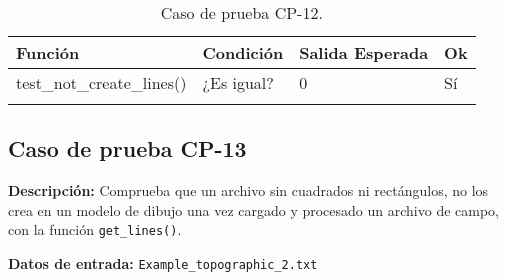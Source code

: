 \begin{longtable}[]{@{}llll@{}}
\toprule
\begin{minipage}[b]{0.6\columnwidth}\raggedright\strut
Función\strut
\end{minipage} & \begin{minipage}[b]{0.20\columnwidth}\raggedright\strut
Condición\strut
\end{minipage} & \begin{minipage}[b]{0.15\columnwidth}\raggedright\strut
Salida Esperada\strut
\end{minipage} & \begin{minipage}[b]{0.05\columnwidth}\raggedright\strut
Ok\strut
\end{minipage}\tabularnewline
\midrule
\endhead
\begin{minipage}[t]{0.6\columnwidth}\raggedright\strut
\small{test\_not\_create\_lines()}\strut
\end{minipage} & \begin{minipage}[t]{0.20\columnwidth}\raggedright\strut
¿Es igual?\strut
\end{minipage} & \begin{minipage}[t]{0.15\columnwidth}\raggedright\strut
0\strut
\end{minipage} & \begin{minipage}[t]{0.05\columnwidth}\raggedright\strut
Sí\strut
\end{minipage}\tabularnewline

\bottomrule
\caption{Caso de prueba CP-12.}
\end{longtable}


\subsection{Caso de prueba CP-13}

\textbf{Descripción:} Comprueba que un archivo sin cuadrados ni rectángulos, no los crea en un modelo de dibujo una vez cargado y procesado un archivo de campo, con la función \texttt{get\_lines()}.

\textbf{Datos de entrada:} \texttt{Example\_topographic\_2.txt}


